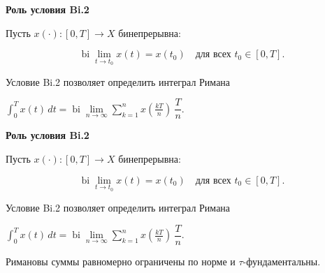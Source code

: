 \documentclass[11pt]{article}
\begin{document}
\newpage

\begin{center}
{\color{notaeYELLOW}\bfseries\fontsize{44}{52}\selectfont Роль условия Bi.2}
\end{center}
\vspace*{\fill}
\begin{center}
\fontsize{36}{43}\selectfont
\parbox{\linewidth}{\centering\noindent Пусть $x(\cdot):[0,T]\to X$ бинепрерывна:
\par}\vspace{0.4in}
\parbox{\linewidth}{\centering\noindent $$\operatorname{bi}\lim\limits_{t\to t_0}x(t)=x(t_0)\quad\text{для всех }t_0\in[0,T].$$
\par}\vspace{0.4in}
\parbox{\linewidth}{\centering\noindent Условие Bi.2 позволяет определить интеграл Римана
\par}\vspace{0.4in}
\parbox{\linewidth}{\centering\noindent $\int_0^T x(t)\,dt=\operatorname{bi}\lim\limits_{n\to\infty}\sum\limits_{k=1}^n x\left(\frac{kT}{n}\right)\ \dfrac{T}{n}.$
\par}\vspace{0.4in}
\end{center}
\vspace*{\fill}

\newpage

\begin{center}
{\color{notaeYELLOW}\bfseries\fontsize{44}{52}\selectfont Роль условия Bi.2}
\end{center}
\vspace*{\fill}
\begin{center}
\fontsize{36}{43}\selectfont
\parbox{\linewidth}{\centering\noindent Пусть $x(\cdot):[0,T]\to X$ бинепрерывна:
\par}\vspace{0.4in}
\parbox{\linewidth}{\centering\noindent $$\operatorname{bi}\lim\limits_{t\to t_0}x(t)=x(t_0)\quad\text{для всех }t_0\in[0,T].$$
\par}\vspace{0.4in}
\parbox{\linewidth}{\centering\noindent Условие Bi.2 позволяет определить интеграл Римана
\par}\vspace{0.4in}
\parbox{\linewidth}{\centering\noindent $\int_0^T x(t)\,dt=\operatorname{bi}\lim\limits_{n\to\infty}\sum\limits_{k=1}^n x\left(\frac{kT}{n}\right)\ \dfrac{T}{n}.$
\par}\vspace{0.4in}
\parbox{\linewidth}{\centering\noindent Римановы суммы равномерно ограничены по норме и $\tau$-фундаментальны.
\par}\vspace{0.4in}
\end{center}
\vspace*{\fill}
\end{document}
